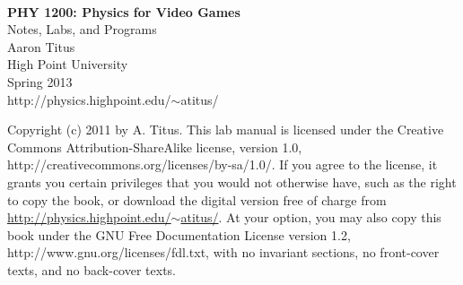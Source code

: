 \documentclass[10pt]{tituslab}
\begin{document}
\myeqnspacing %
\frontmatter
\yesiwantarabic
\frontmatter
\thispagestyle{empty}
\noindent\vspace{0mm}\\
\noindent\vspace{10mm}\hspace{6mm}\textsf{\textbf{\Huge{PHY 1200: Physics for Video Games}}}\\
\noindent\vspace{4mm}\hspace{4in}\textsf{\Large{Notes, Labs, and Programs}}\\
\noindent\vspace{4mm}\hspace{4in}\textsf{\Large{Aaron Titus}}\\
\noindent\vspace{4mm}\hspace{4in}\textsf{\Large{High Point University}}\\
\noindent\vspace{4mm}\hspace{4in}\textsf{Spring 2013}\\
\noindent\vspace{4mm}\hspace{4in}\textsf{http://physics.highpoint.edu/$\sim$atitus/}
\yesiwantarabic
\mynormaltype

\pagebreak[4]
\noindent
Copyright (c) 2011 by A. Titus. This lab manual is
    licensed under the Creative Commons
    Attribution-ShareAlike license, version 1.0, 
    http://creativecommons.org/licenses/by-sa/1.0/.
    If you agree to the license, it grants you certain privileges that
    you would not otherwise have, such as the right to copy the book,
    or download the digital version free of charge from
    \href{http://physics.highpoint.edu/~atitus/}{http://physics.highpoint.edu/$\sim$atitus/}. At your option, you may also copy this book
    under the GNU Free Documentation License version 1.2, http://www.gnu.org/licenses/fdl.txt,
    with no invariant sections, no front-cover texts, and no back-cover texts.


\tableofcontents
\mainmatter
\startchaptersonleftpage
\addtocounter{page}{4} 
\parafmt
\myeqnspacing %
\end{document}
